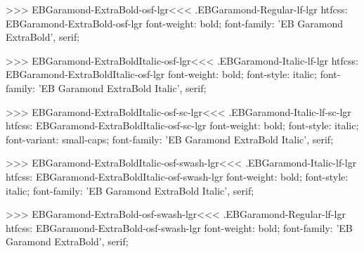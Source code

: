 >>>
\<EBGaramond-ExtraBold-osf-lgr\><<<
.EBGaramond-Regular-lf-lgr
htfcss:  EBGaramond-ExtraBold-osf-lgr  font-weight: bold; font-family: 'EB Garamond ExtraBold', serif;

>>>
\<EBGaramond-ExtraBoldItalic-osf-lgr\><<<
.EBGaramond-Italic-lf-lgr
htfcss:  EBGaramond-ExtraBoldItalic-osf-lgr  font-weight: bold; font-style: italic; font-family: 'EB Garamond ExtraBold Italic', serif;

>>>
\<EBGaramond-ExtraBoldItalic-osf-sc-lgr\><<<
.EBGaramond-Italic-lf-sc-lgr
htfcss:  EBGaramond-ExtraBoldItalic-osf-sc-lgr  font-weight: bold; font-style: italic; font-variant: small-caps; font-family: 'EB Garamond ExtraBold Italic', serif;

>>>
\<EBGaramond-ExtraBoldItalic-osf-swash-lgr\><<<
.EBGaramond-Italic-lf-lgr
htfcss:  EBGaramond-ExtraBoldItalic-osf-swash-lgr  font-weight: bold; font-style: italic; font-family: 'EB Garamond ExtraBold Italic', serif;

>>>
\<EBGaramond-ExtraBold-osf-swash-lgr\><<<
.EBGaramond-Regular-lf-lgr
htfcss:  EBGaramond-ExtraBold-osf-swash-lgr  font-weight: bold; font-family: 'EB Garamond ExtraBold', serif;

